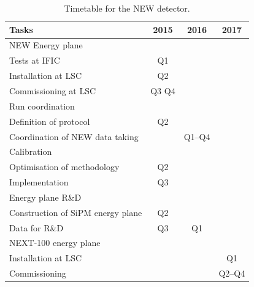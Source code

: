 \documentclass[a4paper,11pt,oneside]{article}
\begin{document}
\begin{table}[h!]
\begin{center}
\begin{tabular}{| l | c | c | c |}
\hline
Tasks & 2015 & 2016 & 2017 \\
\hline
NEW Energy plane & & & \\
\hline
Tests at IFIC & Q1 & & \\
Installation at LSC & Q2 & & \\
Commissioning at LSC & Q3 Q4 & & \\
\hline
Run coordination & & &   \\
\hline
Definition of protocol & Q2 & & \\
Coordination of NEW data taking & & Q1--Q4 & \\
\hline
Calibration & & &   \\
\hline
Optimisation of methodology & Q2 & & \\
Implementation & Q3 & & \\
\hline
Energy plane R\&D & &&  \\
\hline
Construction of SiPM energy plane & Q2 & & \\
Data for R\&D & Q3 & Q1 & \\
\hline
NEXT-100 energy plane & & & \\
\hline
Installation at LSC & & & Q1\\
Commissioning & & &  Q2--Q4\\
\hline
\end{tabular}
\caption{Timetable for the NEW detector.}
\label{tab:schedule_new}
\end{center}
\end{table} 
\end{document}
